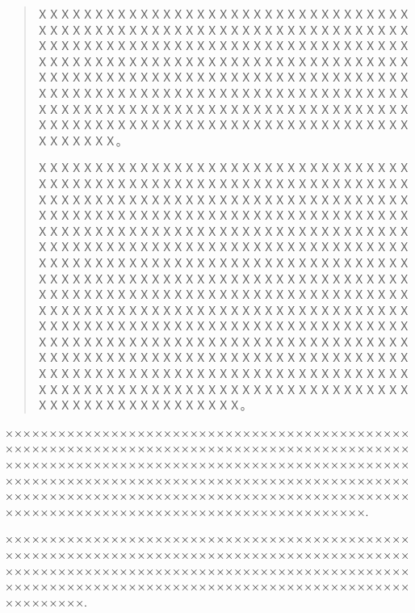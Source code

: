 \documentclass[a4paper]{ltxdoc}
\begin{document}





\begin{abstract}
ＸＸＸＸＸＸＸＸＸＸＸＸＸＸＸＸＸＸＸＸＸＸＸＸＸＸＸＸＸＸＸＸＸＸＸＸＸＸＸＸＸＸＸＸＸＸＸＸＸＸＸＸＸＸＸＸＸＸＸＸＸＸＸＸＸＸＸＸＸＸＸＸＸＸＸＸＸＸＸＸＸＸＸＸＸＸＸＸＸＸＸＸＸＸＸＸＸＸＸＸＸＸＸＸＸＸＸＸＸＸＸＸＸＸＸＸＸＸＸＸＸＸＸＸＸＸＸＸＸＸＸＸＸＸＸＸＸＸＸＸＸＸＸＸＸＸＸＸＸＸＸＸＸＸＸＸＸＸＸＸＸＸＸＸＸＸＸＸＸＸＸＸＸＸＸＸＸＸＸＸＸＸＸＸＸＸＸＸＸＸＸＸＸＸＸＸＸＸＸＸＸＸＸＸＸＸＸＸＸＸＸＸＸＸＸＸＸＸＸＸＸＸＸＸＸＸＸＸＸＸＸＸＸＸＸＸＸＸＸＸＸＸＸＸＸＸＸＸＸＸＸＸＸＸＸＸＸＸＸＸＸＸＸＸＸＸＸＸＸＸＸ。

ＸＸＸＸＸＸＸＸＸＸＸＸＸＸＸＸＸＸＸＸＸＸＸＸＸＸＸＸＸＸＸＸＸＸＸＸＸＸＸＸＸＸＸＸＸＸＸＸＸＸＸＸＸＸＸＸＸＸＸＸＸＸＸＸＸＸＸＸＸＸＸＸＸＸＸＸＸＸＸＸＸＸＸＸＸＸＸＸＸＸＸＸＸＸＸＸＸＸＸＸＸＸＸＸＸＸＸＸＸＸＸＸＸＸＸＸＸＸＸＸＸＸＸＸＸＸＸＸＸＸＸＸＸＸＸＸＸＸＸＸＸＸＸＸＸＸＸＸＸＸＸＸＸＸＸＸＸＸＸＸＸＸＸＸＸＸＸＸＸＸＸＸＸＸＸＸＸＸＸＸＸＸＸＸＸＸＸＸＸＸＸＸＸＸＸＸＸＸＸＸＸＸＸＸＸＸＸＸＸＸＸＸＸＸＸＸＸＸＸＸＸＸＸＸＸＸＸＸＸＸＸＸＸＸＸＸＸＸＸＸＸＸＸＸＸＸＸＸＸＸＸＸＸＸＸＸＸＸＸＸＸＸＸＸＸＸＸＸＸＸＸＸＸＸＸＸＸＸＸＸＸＸＸＸＸＸＸＸＸＸＸＸＸＸＸＸＸＸＸＸＸＸＸＸＸＸＸＸＸＸＸＸＸＸＸＸＸＸＸＸＸＸＸＸＸＸＸＸＸＸＸＸＸＸＸＸＸＸＸＸＸＸＸＸＸＸＸＸＸＸＸＸＸＸＸＸＸＸＸＸＸＸＸＸＸＸＸＸＸＸＸＸＸＸＸＸＸＸＸＸＸＸＸＸＸＸＸＸＸＸＸＸＸＸＸＸＸＸＸＸＸＸＸＸＸＸＸＸＸＸＸＸＸＸＸＸＸＸＸＸＸＸＸＸＸＸＸＸＸＸＸＸＸＸＸＸＸＸＸＸＸＸＸＸＸＸＸＸＸＸＸＸＸＸＸＸＸＸＸＸＸＸＸＸＸＸＸＸＸＸＸＸＸＸＸＸＸＸＸＸＸＸＸＸＸＸＸＸＸＸＸＸＸＸＸＸＸＸＸＸＸＸＸＸＸＸＸＸＸＸＸＸＸ。

\end{abstract}

\begin{abstractEn}
×××××××××××××××××××××××××××××××××××××××××××××××××××××××××××××××××××××××××××××××××××××××××××××××××××××××××××××××××××××××××××××××××××××××××××××××××××××××××××××××××××××××××××××××××××××××××××××××××××××××××××××××××××××××××××××××××××××××××××××××××××××××××××××××××××××××××××××××.

×××××××××××××××××××××××××××××××××××××××××××××××××××××××××××××××××××××××××××××××××××××××××××××××××××××××××××××××××××××××××××××××××××××××××××××××××××××××××××××××××××××××××××××××××××××××××××××××××.
\end{abstractEn}
\end{document}
